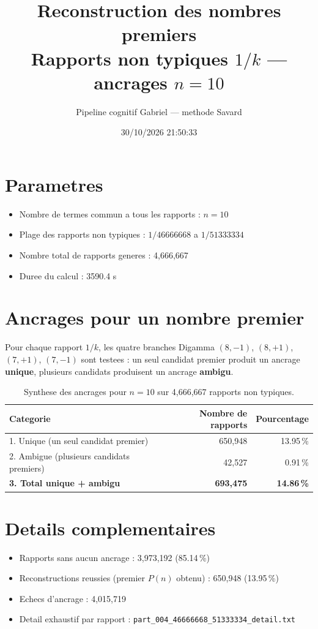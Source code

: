 \documentclass[12pt]{article}
\title{Reconstruction des nombres premiers\\Rapports non typiques $1/k$ --- ancrages $n=10$
}
\author{Pipeline cognitif Gabriel --- methode Savard}
\date{30/10/2026 21:50:33}
\begin{document}
\maketitle

\section*{Parametres}
\begin{itemize}
\item Nombre de termes commun a tous les rapports : $n=10$
\item Plage des rapports non typiques : $1/46666668$ a $1/51333334$
\item Nombre total de rapports generes : 4,666,667
\item Duree du calcul : 3590.4 s
\end{itemize}

\section*{Ancrages pour un nombre premier}

Pour chaque rapport $1/k$, les quatre branches Digamma $(8,-1)$, $(8,+1)$, $(7,+1)$, $(7,-1)$ sont testees : un seul candidat premier produit un ancrage \textbf{unique}, plusieurs candidats produisent un ancrage \textbf{ambigu}.

\begin{table}[h!]
\centering
\caption{Synthese des ancrages pour $n=10$ sur 4,666,667 rapports non typiques.}
\begin{tabular}{lrr}
\toprule
\textbf{Categorie} & \textbf{Nombre de rapports} & \textbf{Pourcentage} \\
\midrule
1. Unique (un seul candidat premier) & 650,948 & 13.95\,\% \\
2. Ambigue (plusieurs candidats premiers) & 42,527 & 0.91\,\% \\
\midrule
\textbf{3. Total unique + ambigu} & \textbf{693,475} & \textbf{14.86\,\%} \\
\bottomrule
\end{tabular}
\end{table}

\section*{Details complementaires}
\begin{itemize}
\item Rapports sans aucun ancrage : 3,973,192 (85.14\,\%)
\item Reconstructions reussies (premier $P(n)$ obtenu) : 650,948 (13.95\,\%)
\item Echecs d'ancrage : 4,015,719
\item Detail exhaustif par rapport : \texttt{part_004_46666668_51333334_detail.txt}
\end{itemize}
\end{document}
